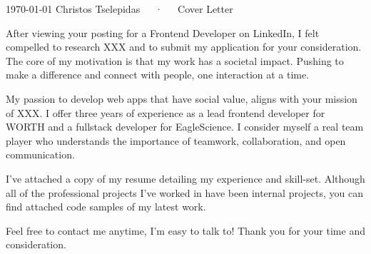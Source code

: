 \documentclass[11pt, a4paper]{awesome-cv}
\begin{document}
\makecvheader[C]

\makecvfooter
  {\today}
  {Christos Tselepidas~~~·~~~Cover Letter}
  {}

\makelettertitle

\begin{cvletter}

After viewing your posting for a Frontend Developer on LinkedIn, I felt compelled to research XXX and to submit my application for your consideration. The core of my motivation is that my work has a societal impact. Pushing to make a difference and connect with people, one interaction at a time.

My passion to develop web apps that have social value, aligns with your mission of XXX. I offer three years of experience as a lead frontend developer for WORTH and a fullstack developer for EagleScience. I consider myself a real team player who understands the importance of teamwork, collaboration, and open communication.

I’ve attached a copy of my resume detailing my experience and skill-set. Although all of the professional projects I've worked in have been internal projects, you can find attached code samples of my latest work.

Feel free to contact me anytime, I'm easy to talk to! Thank you for your time and consideration.

\end{cvletter}


\makeletterclosing
\end{document}
